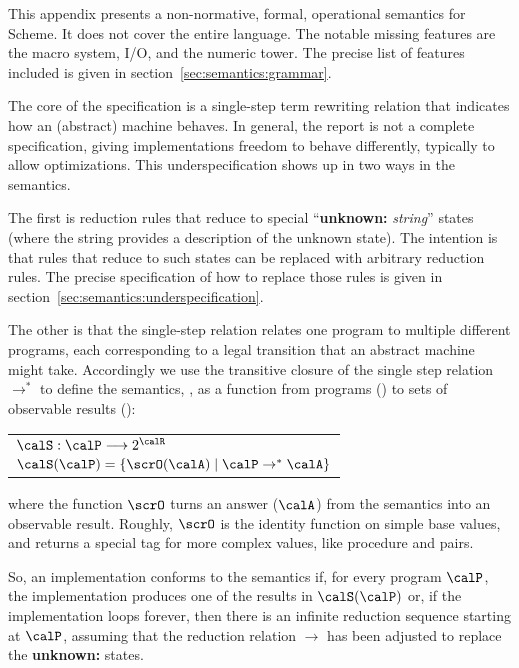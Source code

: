 
This appendix presents a non-normative, formal, operational semantics for Scheme. It does not cover the entire language. The notable missing features are the macro system, I/O, and the numeric tower. The precise list of features included is given in section~\ref{sec:semantics:grammar}.

The core of the specification is a single-step term rewriting relation that indicates how an (abstract) machine behaves. In general, the report is not a complete specification, giving implementations freedom to behave differently, typically to allow optimizations. This underspecification shows up in two ways in the semantics. 

The first is reduction rules that reduce to special ``\textbf{unknown:} \textit{string}'' states (where the string provides a description of the unknown state). The intention is that rules that reduce to such states can be replaced with arbitrary reduction rules. The precise specification of how to replace those rules is given in section~\ref{sec:semantics:underspecification}.

The other is that the single-step relation relates one program to
multiple different programs, each corresponding to a legal transition
that an abstract machine might take. Accordingly we use the transitive
closure of the single step relation $\rightarrow^*$ to define the
semantics, \calS, as a function from programs (\calP)
to sets of observable results (\calR):
\begin{center}
\begin{tabular}{l}
$\calS : \calP \longrightarrow 2^{\calR}$ \\
$\calS(\calP) = \{ \scrO(\calA) \mid \calP \rightarrow^* \calA \}$
\end{tabular}
\end{center}
where the function $\scrO$ turns an answer ($\calA$) from the semantics into an observable result. Roughly, $\scrO$ is the identity function on simple base values, and returns a special tag for more complex values, like procedure and pairs.

So, an implementation conforms to the semantics if, for every program $\calP$, the implementation produces one of the results in $\calS(\calP)$ or, if the implementation loops forever, then there is an infinite reduction sequence starting at $\calP$, assuming that the reduction relation $\rightarrow$ has been adjusted to replace the \textbf{unknown:} states.

